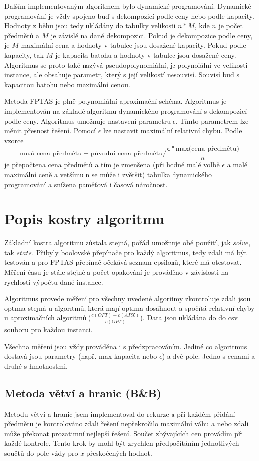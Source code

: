 \documentclass[11pt]{article}
\begin{document}
Dalším implementovaným algoritmem bylo dynamické programování. Dynamické programování je vždy spojeno buď s dekompozicí podle ceny nebo podle kapacity. 
Hodnoty z běhu jsou tedy ukládány do tabulky velikosti $n*M$, kde $n$ je počet předmětů a $M$ je závislé na dané dekompozici. Pokud je dekompozice podle ceny, je $M$ maximální cena a hodnoty v tabulce jsou dosažené kapacity. Pokud podle kapacity, tak $M$ je kapacita batohu a hodnoty v tabulce jsou dosažené ceny. 
Algoritmus se proto také nazývá pseudopolynomiální, je polynoiální ve velikosti instance, ale obsahuje parametr, který s její velikostí nesouvisí. Souvisí buď s kapacitou batohu nebo maximální cenou. 

Metoda FPTAS je plně polynomiální aproximační schéma. Algoritmus je implementován na základě algoritmu dynamického programování s dekompozicí podle ceny. Algoritmus umožnuje nastavení parametru $\epsilon$. Tímto parametrem lze měnit přesnost řešení. Pomocí $\epsilon$ lze nastavit maximální relativní chybu. Podle vzorce $$\text{nová cena předmětu} = \text{původní cena předmětu}/\frac{\mathbf{\epsilon} *  \text{max(cena předmětu)}}{n}$$ je přepočtena cena předmětů a tím je zmenšena (při hodně malé volbě $\epsilon$ a malé maximální ceně a vetšímu n se může i zvětšit) tabulka dynamického programování a snížena paměťová i časová náročnost.

\section{Popis kostry algoritmu}\label{kap:2}
Základní kostra algoritmu zůstala stejná, pořád umožnuje obě použití, jak $solve$, tak $stats$. Přibyly boolovské přepínače pro každý algoritmus, tedy zdali má být testován a pro FPTAS přepínač očekává seznam epsilonů, které má otestovat. Měření času je stále stejné a počet opakování je prováděno v závislosti na rychlosti výpočtu dané instance.

Algoritmus provede měření pro všechny uvedené algoritmy zkontroluje zdali jsou optima stejná u algoritmů, která mají optima dosáhnout a spočítá relativní chyby u aproximačních algoritmů ($\frac{c(OPT) - c(APX)}{c(OPT)}$). Data jsou ukládána do do csv souboru pro každou instanci.

Všechna měření jsou vždy prováděna i s předzpracováním. Jediné co algoritmus dostavá jsou parametry (např. max kapacita nebo $\epsilon$) a dvě pole. Jedno s cenami a druhé s hmotnostmi.

\subsection{Metoda větví a hranic (B\&B)}
Metodu větví a hranic jsem implementoval do rekurze a při každém přidání předmětu je kontrolováno zdali řešení nepřekročilo maximální váhu a nebo zdali může překonat prozatimní nejlepší řešení. Součet zbývajících cen provádím při každé kontrole. Tento krok by mohl být zrychlen předpočítáním jednotlivých součtů do pole vždy pro $x$ přeskočených hodnot. 
\end{document}
